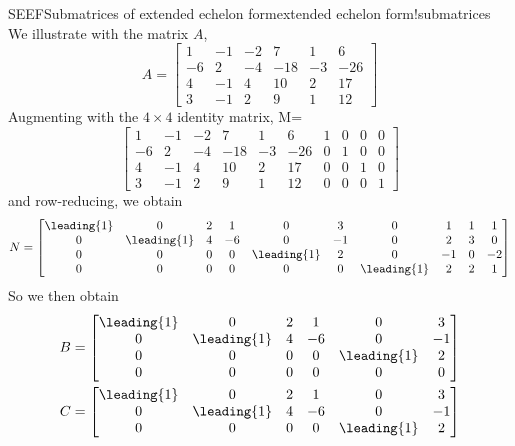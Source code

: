 \begin{example}{SEEF}{Submatrices of extended echelon form}{extended echelon form!submatrices}
We illustrate  with the matrix $A$,
%
\begin{equation*}
A=
\begin{bmatrix}
 1 & -1 & -2 & 7 & 1 & 6 \\
 -6 & 2 & -4 & -18 & -3 & -26 \\
 4 & -1 & 4 & 10 & 2 & 17 \\
 3 & -1 & 2 & 9 & 1 & 12
\end{bmatrix}
\end{equation*}
%
Augmenting with the $4\times 4$ identity matrix,
%
M=
\begin{equation*}
\begin{bmatrix}
 1 & -1 & -2 & 7 & 1 & 6 & 1 & 0 & 0 & 0 \\
 -6 & 2 & -4 & -18 & -3 & -26 & 0 & 1 & 0 & 0 \\
 4 & -1 & 4 & 10 & 2 & 17 & 0 & 0 & 1 & 0 \\
 3 & -1 & 2 & 9 & 1 & 12 & 0 & 0 & 0 & 1
\end{bmatrix}
\end{equation*}
%
and row-reducing, we obtain
%
\begin{equation*}
N=
\begin{bmatrix}
 \leading{1} & 0 & 2 & 1 & 0 & 3 & 0 & 1 & 1 & 1\\
 0 & \leading{1} & 4 & -6 & 0 & -1 & 0 & 2 & 3 & 0 \\
 0 & 0 & 0 & 0 & \leading{1} & 2 & 0 & -1 & 0 & -2 \\
 0 & 0 & 0 & 0 & 0 & 0 & \leading{1} & 2 & 2 & 1
\end{bmatrix}
\end{equation*}
%
So we then obtain
%
\begin{align*}
B&=
\begin{bmatrix}
 \leading{1} & 0 & 2 & 1 & 0 & 3 \\
 0 & \leading{1} & 4 & -6 & 0 & -1 \\
 0 & 0 & 0 & 0 & \leading{1} & 2 \\
 0 & 0 & 0 & 0 & 0 & 0 
\end{bmatrix}\\
%
C&=
\begin{bmatrix}
 \leading{1} & 0 & 2 & 1 & 0 & 3 \\
 0 & \leading{1} & 4 & -6 & 0 & -1 \\
 0 & 0 & 0 & 0 & \leading{1} & 2
\end{bmatrix}\\

\end{align*}
\end{example}
